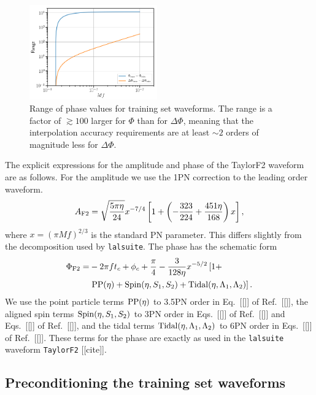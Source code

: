 \documentclass[prd,aps,letter,twocolumn,floatfix,notitlepage,nofootinbib]{revtex4-1}
\begin{document}
\begin{figure}[htb]
\centering
\includegraphics[width=0.49\textwidth]{phaserange.png}
\caption{Range of phase values for training set waveforms. The range is a factor of $\gtrsim 100$ larger for $\Phi$ than for $\Delta\Phi$, 
meaning that the interpolation accuracy requirements are at least $\sim 2$ orders of magnitude less for $\Delta\Phi$.}
\label{fig:phaserange}
\end{figure}

The explicit expressions for the amplitude and phase of the TaylorF2 waveform are as follows. For the amplitude we use the 1PN correction to the leading order waveform.
\begin{equation}
A_{\rm F2} = \sqrt{\frac{5\pi\eta}{24}} x^{-7/4} \left[ 1 + \left(-\frac{323}{224} + \frac{451\eta}{168} \right)x \right],
\end{equation}
where $x=(\pi M f)^{2/3}$ is the standard PN parameter. This differs slightly from the decomposition used by \texttt{lalsuite}. The phase has the schematic form
\begin{align}
\Phi_{\rm F2} =& -2\pi f t_c + \phi_c + \frac{\pi}{4} - \frac{3}{128\eta}x^{-5/2} \left[1 + \right. \\
                        & \left. {\rm PP}(\eta) + {\rm Spin}(\eta, S_1, S_2) + {\rm Tidal}(\eta, \Lambda_1, \Lambda_2)  \right].
\end{align}
We use the point particle terms ${\rm PP}(\eta)$ to 3.5PN order in Eq.~[[]] of Ref.~[[]], the aligned spin terms ${\rm Spin}(\eta, S_1, S_2)$ to 3PN order in Eqs.~[[]] of Ref.~[[]] and Eqs.~[[]] of Ref.~[[]], and the tidal terms ${\rm Tidal}(\eta, \Lambda_1, \Lambda_2)$ to 6PN order in Eqs.~[[]] of Ref.~[[]]. These terms for the phase are exactly as used in the \texttt{lalsuite} waveform \texttt{TaylorF2} [[cite]].




\subsection{Preconditioning the training set waveforms}
\end{document}
